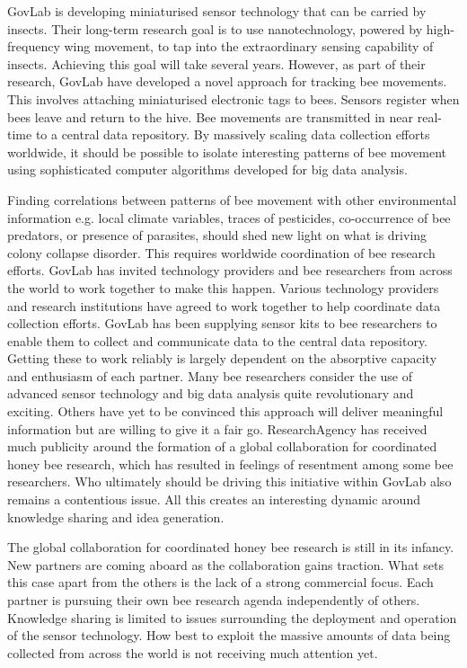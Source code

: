 GovLab is developing miniaturised sensor technology that can be carried by insects. Their long-term research goal is to use nanotechnology, powered by high-frequency wing movement, to tap into the extraordinary sensing capability of insects. Achieving this goal will take several years. However, as part of their research, GovLab have developed a novel approach for tracking bee movements. This involves attaching miniaturised electronic tags to bees. Sensors register when bees leave and return to the hive. Bee movements are transmitted in near real-time to a central data repository. By massively scaling data collection efforts worldwide, it should be possible to isolate interesting patterns of bee movement using sophisticated computer algorithms developed for big data analysis.\medskip

Finding correlations between patterns of bee movement with other environmental information e.g. local climate variables, traces of pesticides, co-occurrence of bee predators, or presence of parasites, should shed new light on what is driving colony collapse disorder. This requires worldwide coordination of bee research efforts. GovLab has invited technology providers and bee researchers from across the world to work together to make this happen. Various technology providers and research institutions have agreed to work together to help coordinate data collection efforts. GovLab has been supplying sensor kits to bee researchers to enable them to collect and communicate data to the central data repository. Getting these to work reliably is largely dependent on the absorptive capacity and enthusiasm of each partner. Many bee researchers consider the use of advanced sensor technology and big data analysis quite revolutionary and exciting. Others have yet to be convinced this approach will deliver meaningful information but are willing to give it a fair go. ResearchAgency has received much publicity around the formation of a global collaboration for coordinated honey bee research, which has resulted in feelings of resentment among some bee researchers. Who ultimately should be driving this initiative within GovLab also remains a contentious issue. All this creates an interesting dynamic around knowledge sharing and idea generation. \medskip

The global collaboration for coordinated honey bee research is still in its infancy. New partners are coming aboard as the collaboration gains traction. What sets this case apart from the others is the lack of a strong commercial focus. Each partner is pursuing their own bee research agenda independently of others. Knowledge sharing is limited to issues surrounding the deployment and operation of the sensor technology. How best to exploit the massive amounts of data being collected from across the world is not receiving much attention yet.\medskip  

